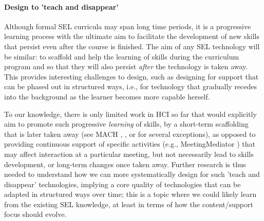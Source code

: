 \documentclass[prodmode,acmtochi]{acmsmall}
\newcommand{\GeraldineFIXNEW}[1]{}
\newcommand{\revision}[1]{#1}
\begin{document}
\paragraph{Design to 'teach and disappear'} Although formal SEL curricula may span long time periods, it is a progressive learning process with the ultimate aim to facilitate the development of new skills that persist even after the course is finished. The aim of any SEL technology will be similar: to scaffold and help the learning of skills during the curriculum program and so that they will also persist \emph{after} the technology is taken away. This provides interesting  challenges to design, such as designing for support that can be phased out in structured ways, i.e., for technology that gradually recedes into the background as the learner becomes more capable herself. 

\revision{To our knowledge, there is only limited work in HCI so far that would explicitly aim to promote such progressive \emph{learning} of skills, by a short-term scaffolding that is later taken away (see MACH \cite{Hoque2013}, \cite{Pina2014}, or \cite{Bouchard2012} for several exceptions), as opposed to providing continuous support of specific activities (e.g., MeetingMediator \cite{Kim2008}) that may affect interaction at a particular meeting, but not necessarily lead to skills development, or long-term changes once taken away. Further research is thus needed to understand how we can more systematically design for such 'teach and disappear' technologies, implying a core quality of technologies that can be adapted in structured ways over time; this is a topic where we could likely learn from the existing SEL knowledge, at least in terms of how the content/support focus should evolve.} 
%
\GeraldineFIXNEW{PETR --- made further changes, but not sure if those made things clearer.... 
GF NOTE: last part of the last para hard to follow ... not sure if this is clearer now}
\end{document}
